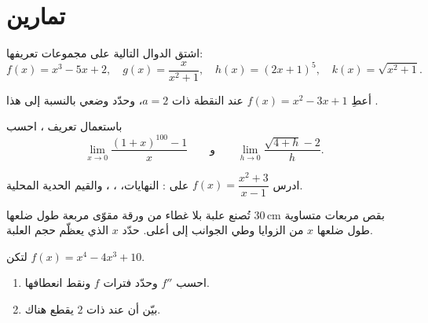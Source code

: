 \section{تمارين}

\begin{exercise}[$\star$]\label{exo:g12:deriv:1}
اشتق الدوال التالية على مجموعات تعريفها:
\[
f(x) = x^3 - 5x + 2, \quad
g(x) = \frac{x}{x^2+1}, \quad
h(x) = (2x+1)^5, \quad
k(x) = \sqrt{x^2 + 1}.
\]
\end{exercise}

\begin{exercise}[$\star$]\label{exo:g12:deriv:2}
أعطِ    $f(x) = x^2 - 3x + 1$ عند
النقطة ذات  $a = 2$، وحدّد وضعي 
بالنسبة إلى هذا .
\end{exercise}

\begin{exercise}[$\star$]\label{exo:g12:deriv:3}
باستعمال تعريف ، احسب
\[
\lim_{x \to 0} \frac{(1+x)^{100} - 1}{x}
\qquad\text{و}\qquad
\lim_{h \to 0} \frac{\sqrt{4+h} - 2}{h}.
\]
\end{exercise}

\begin{exercise}[$\star\star$]\label{exo:g12:deriv:4}
ادرس  $f(x) = \dfrac{x^2 + 3}{x - 1}$ على : النهايات،
، ، والقيم الحدية المحلية.
\end{exercise}

\begin{exercise}[$\star\star$]\label{exo:g12:deriv:5}
تُصنع علبة بلا غطاء من ورقة مقوّى مربعة طول ضلعها
$30\,$cm بقص مربعات متساوية طول ضلعها $x$ من الزوايا وطي
الجوانب إلى أعلى. حدّد $x$ الذي يعظّم حجم العلبة.
\end{exercise}

\begin{exercise}[$\star\star$]\label{exo:g12:deriv:6}
لتكن $f(x) = x^4 - 4x^3 + 10$.
\begin{enumerate}
  \item احسب $f''$ وحدّد فترات  $f$ ونقط
        انعطافها.
  \item بيّن أن  عند  ذات  $2$
        يقطع  هناك.
\end{enumerate}
\end{exercise}

